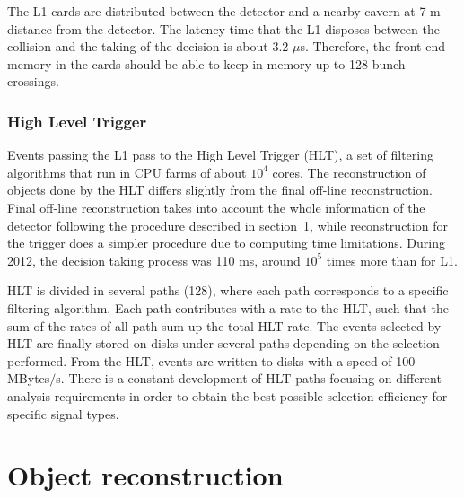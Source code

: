 The L1 cards are distributed between the detector and a nearby cavern at 7 m distance from the detector. The latency time that the L1 disposes between the collision and the taking of the decision is about 3.2 $\mu$s. Therefore, the front-end memory in the cards should be able to keep in memory up to 128 bunch crossings. 

\subsubsection{High Level Trigger}
\label{sec:HLT}


Events passing the L1 pass to the High Level Trigger (HLT), a set of filtering algorithms that run in CPU farms of about $10^{4}$ cores. The reconstruction of objects done by the HLT differs slightly from the final off-line reconstruction. Final off-line reconstruction takes into account the whole information of the detector following the procedure described in section~\ref{sec:reco}, while reconstruction for the trigger does a simpler procedure due to computing time limitations. During 2012, the decision taking process was 110 ms, around $10^{5}$ times more than for L1. 

HLT is divided in several paths (128), where each path corresponds to a specific filtering algorithm. Each path contributes with a rate to the HLT, such that the sum of the rates of all path sum up the total HLT rate. The events selected by HLT are finally stored on disks under several paths depending on the selection performed. From the HLT, events are written to disks with a speed of 100 MBytes$/$s. There is a constant development of HLT paths focusing on different analysis requirements in order to obtain the best possible selection efficiency for specific signal types. 

\section{Object reconstruction}
\label{sec:reco}

